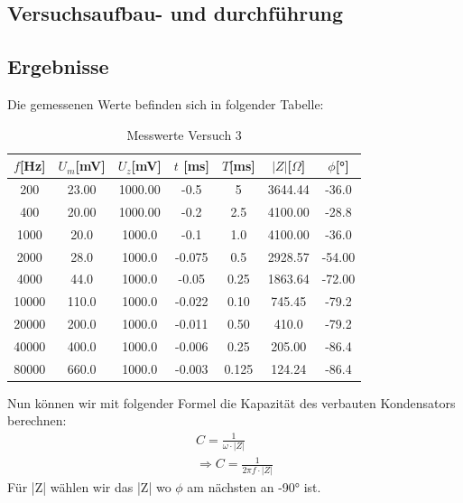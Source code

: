     \subsection{Versuchsaufbau- und durchführung}

    \subsection{Ergebnisse}
    
    Die gemessenen Werte befinden sich in folgender Tabelle:

    \begin{table}[H]
        \centering
        \caption{Messwerte Versuch 3}
        \vspace{0.5em}
        \begin{tabular}{|c||c|c|c|c|c|c|}
            \hline
            $f$[Hz] & $U_m$[mV]  & $U_z$[mV] & $t$ [ms] & $T$[ms] & $|Z|$[$\Omega$] & $\phi$[°] \\
            \hline
            200 & 23.00& 1000.00& -0.5 & 5& 3644.44& -36.0 \\
            \hline
            400 & 20.00 & 1000.00 & -0.2 & 2.5 & 4100.00 & -28.8 \\
            \hline
            1000 & 20.0 & 1000.0 & -0.1 & 1.0 & 4100.00 & -36.0 \\
            \hline
            2000 & 28.0 & 1000.0 & -0.075 & 0.5 & 2928.57 & -54.00  \\
            \hline
            4000 & 44.0 & 1000.0 &  -0.05 & 0.25 & 1863.64 &  -72.00\\
            \hline
            10000 & 110.0 & 1000.0 & -0.022 & 0.10 & 745.45 & -79.2 \\
            \hline
            20000 & 200.0 & 1000.0& -0.011 & 0.50&410.0 & -79.2\\
            \hline
            40000 & 400.0 &1000.0 & -0.006 & 0.25 & 205.00 & -86.4 \\
            \hline
            80000 & 660.0 &1000.0 & -0.003 & 0.125 & 124.24 &  -86.4\\
            \hline
        \end{tabular}
        \label{tab:Versuch3_Messwerte}
\end{table}
Nun können wir mit folgender Formel die Kapazität des verbauten Kondensators berechnen:
\begin{equation}
    \begin{aligned}
        C = \frac{1}{\omega \cdot |Z|} \\
        \Rightarrow C = \frac{1}{2\pi f \cdot |Z|}
        \label{eq:Versuch3_Kapazität}
    \end{aligned}
\end{equation}
Für |Z| wählen wir das |Z| wo $\phi$ am nächsten an -90° ist. 